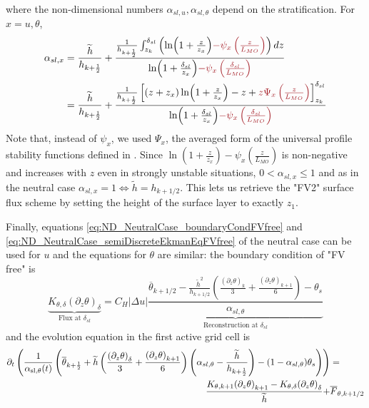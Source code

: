 where the non-dimensional numbers $\alpha_{sl, u},
\alpha_{sl, \theta}$ depend on the stratification. For $x=u, \theta$,
\begin{equation}
	\begin{aligned}
	\alpha_{sl, x} &= \frac{\widetilde{h}}{h_{k+\frac{1}{2}}} +
	\frac{\frac{1}{h_{k+\frac{1}{2}}}\int_{z_k}^{\delta_{sl}}
		\left(\ln(1+\frac{z}{z_{x}})
		\emphase{- \psi_x\left(\frac{z}{L_{MO}}\right)}\right)
	dz}{\ln(1+\frac{\delta_{sl}}{z_{x}})
		\emphase{- \psi_x\left(\frac{\delta_{sl}}{L_{MO}}\right)
		}} \\
		&=\frac{\widetilde{h}}{h_{k+\frac{1}{2}}} +
 \frac{\frac{1}{{h_{k+\frac{1}{2}}}}
    \left[
	    (z+z_{x})\ln(1+\frac{z}{z_{x}})-z
		+\emphase{ z \Psi_x\left(\frac{z}{L_{MO}}\right)}
	\right]_{z_k}^{\delta_{sl}}
    }{\ln(1+\frac{\delta_{sl}}{z_{x}})
		\emphase{- \psi_x\left(\frac{\delta_{sl}}{L_{MO}}\right)
		}}
\end{aligned}
\end{equation}
Note that, instead of $\psi_x$, we used $\Psi_x$,
the averaged form of the universal
profile stability functions defined in \citep{nishizawa_surface_2018}.
%
Since $\ln(1+\frac{z}{z_{x}})-
\psi_x(\frac{z}{L_{MO}})$ is non-negative and increases with $z$ even
in strongly unstable situations,
$0 < \alpha_{sl, x} \leq 1$ and as in the neutral case
$\alpha_{sl, x}=1 \iff \widetilde{h}=h_{k+1/2}$. This lets us retrieve
the "FV2" surface flux scheme by setting the height of the surface
layer to exactly $z_1$.
\par
Finally, equations \eqref{eq:ND_NeutralCase_boundaryCondFVfree} and
\eqref{eq:ND_NeutralCase_semiDiscreteEkmanEqFVfree} of the
neutral case can be used for
$u$ and the equations for $\theta$ are similar:
the boundary condition of "FV free" is
\begin{equation}
	\label{eq:ND_StratifiedCase_semiDiscreteEkmanEqFVfree}
	\underbrace{K_{\theta, \delta} (\partial_z \theta)_\delta}_{
		\text{Flux at } \delta_{sl}
	} = 
	C_H|\Delta u|\underbrace{
	\frac{
  \overline{\theta}_{k+1/2} - \frac{\widetilde{h}^2}{h_{k+1/2}}
	\left(\frac{{(\partial_z \theta)}_k}{3} +
	\frac{{(\partial_z \theta)}_{k+1}}{6}\right) 
  - \theta_s
}{\alpha_{sl, \theta}}
	}_{\text{Reconstruction at } \delta_{sl}}
\end{equation}
and the evolution equation in the first active grid cell is
\begin{equation}
    \begin{aligned}
	\label{eq:ND_StratifiedCase_semiDiscreteEkmanEqPTFVfree}
	    \partial_t \left(\frac{1}{\alpha_{\rm sl, \theta}(t)}
	    \left(
	    \overline{\theta}_{k+\frac{1}{2}} +
	\widetilde{h}\left(\frac{{(\partial_z \theta)}_\delta}{3} +
	\frac{{(\partial_z \theta)}_{k+1}}{6}\right)
		\left(\alpha_{sl, \theta} -
	    	\frac{\widetilde{h}}{h_{k+\frac{1}{2}}}\right)
	 - (1 - \alpha_{sl, \theta})\theta_s
	    \right) \right)&
	= \\
	    \frac{K_{\theta, k+1}{(\partial_z \theta)}_{k+1} -
	K_{\theta,\delta} {(\partial_z \theta)}_\delta}{\widetilde{h}}
	    + &\overline{F}_{\theta, k+1/2}
    \end{aligned}
\end{equation}
